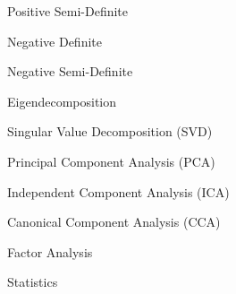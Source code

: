 \documentclass[11pt]{article}
\begin{document}
\begin{enumerate}
\begin{item}
\begin{enumerate}
\begin{item}
\begin{enumerate}
                \begin{item}
                  Positive Semi-Definite 
                \end{item}

                \begin{item}
                  Negative Definite 
                \end{item}

                \begin{item}
                  Negative Semi-Definite 
                \end{item}

            \end{enumerate}

          \end{item}

          \begin{item}

            Eigendecomposition

          \end{item}

          \begin{item}
            Singular Value Decomposition (SVD)
          \end{item}

          \begin{item}
            Principal Component Analysis (PCA)
          \end{item}

          \begin{item}
            Independent Component Analysis (ICA)
          \end{item}

          \begin{item}
            Canonical Component Analysis (CCA)
          \end{item}

          \begin{item}
            Factor Analysis
          \end{item}


      \end{enumerate}

    \end{item}

    \begin{item}

      Statistics

      \begin{enumerate}


\end{enumerate}
\end{item}
\end{enumerate}
\end{document}

